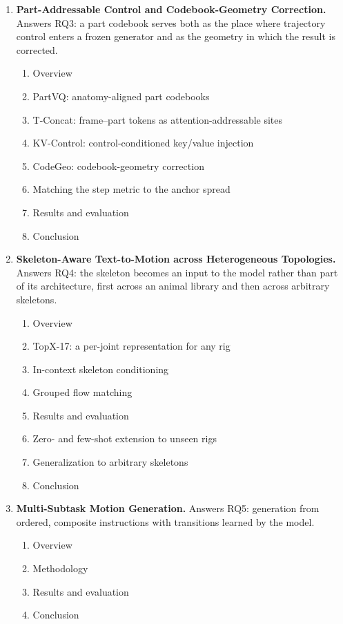 \documentclass[11pt,a4paper]{report}
\begin{document}
\begin{enumerate}[leftmargin=1.4em]
\item \textbf{Part-Addressable Control and Codebook-Geometry Correction.}
  Answers RQ3: a part codebook serves both as the place where trajectory control
  enters a frozen generator and as the geometry in which the result is
  corrected.
  \begin{enumerate}[leftmargin=1.4em]
  \item Overview
  \item PartVQ: anatomy-aligned part codebooks
  \item T-Concat: frame--part tokens as attention-addressable sites
  \item KV-Control: control-conditioned key/value injection
  \item CodeGeo: codebook-geometry correction
  \item Matching the step metric to the anchor spread
  \item Results and evaluation
  \item Conclusion
  \end{enumerate}

\item \textbf{Skeleton-Aware Text-to-Motion across Heterogeneous Topologies.}
  Answers RQ4: the skeleton becomes an input to the model rather than part of
  its architecture, first across an animal library and then across arbitrary
  skeletons.
  \begin{enumerate}[leftmargin=1.4em]
  \item Overview
  \item TopX-17: a per-joint representation for any rig
  \item In-context skeleton conditioning
  \item Grouped flow matching
  \item Results and evaluation
  \item Zero- and few-shot extension to unseen rigs
  \item Generalization to arbitrary skeletons
  \item Conclusion
  \end{enumerate}

\item \textbf{Multi-Subtask Motion Generation.} Answers RQ5: generation from
  ordered, composite instructions with transitions learned by the model.
  \begin{enumerate}[leftmargin=1.4em]
  \item Overview
  \item Methodology
  \item Results and evaluation
  \item Conclusion
  \end{enumerate}


\end{enumerate}
\end{document}
